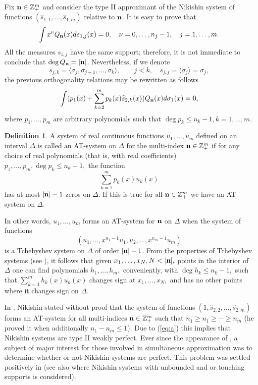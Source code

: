 \documentclass{amsart}
\theoremstyle{definition}
\newtheorem{defi}{\sc Definition}[section]
\theoremstyle{remark}
\newcommand{\la}{\langle}
\newcommand{\ra}{\rangle}
\begin{document}
Fix ${\bf n} \in {\mathbb{Z}}_+^{m}$ and consider the type II approximant of the Nikishin system of functions $(\widehat{s}_{1,1},\ldots,\widehat{s}_{1,m})$ relative to $\bf n$. It is easy to prove that
\[ \int x^{\nu} Q_{\bf n}(x) ds_{1,j}(x) =0, \quad \nu = 0,\ldots,n_j -1,\quad j=1,\ldots,m.
\]
All the measures $s_{1,j}$ have the same support; therefore, it is not immediate to conclude that $\deg Q_{\bf n} = |{\bf n}|$. Nevertheless, if we denote
\[s_{j,k} = \la \sigma_j,\sigma_{j+1},\ldots,\sigma_k \ra,\qquad j < k, \quad s_{j,j} = \la \sigma_j \ra = \sigma_j,
\]
the previous orthogonality relations may be rewritten as follows
\begin{equation}
\label{eq:a}
\int (p_1 (x) + \sum_{k=2}^m p_k(x)\widehat{s}_{2,k}(x))Q_{\bf n}(x) d \sigma_1(x) =0,
\end{equation}
where $p_1,\ldots,p_m$ are arbitrary polynomials such that $\deg p_k \leq n_k -1, k=1,\ldots,m.$

\begin{defi} \label{def:AT} A system of real continuous functions $u_1,\ldots,u_m$ defined on an interval $\Delta$ is called an AT-system on $\Delta$ for the multi-index ${\bf n} \in {\mathbb{Z}}_+^{m}$ if for any choice of real polynomials (that is, with real coefficients) $p_1,\ldots,p_m, \deg p_k \leq n_k -1,$ the function
\[ \sum_{k=1}^m p_k(x) u_k(x)
\]
has at most $|{\bf n}| -1$ zeros on $\Delta$. If this is true for all ${\bf n} \in {\mathbb{Z}}_+^{m}$ we have an AT system on $\Delta$.
\end{defi}

In other words, $u_1,\ldots,u_m$ forms an AT-system for ${\bf n}$ on $\Delta$ when the system of functions
\[ (u_1,\ldots, x^{n_1 -1}u_1,u_2,\ldots,x^{n_m-1}u_m)
\]
is a Tchebyshev system on $\Delta$ of order $|{\bf n}| -1$. From the properties of Tchebyshev systems (see \cite[Theorem 1.1]{KN}), it follows that given
$x_1,\ldots,x_N, N < |{\bf n}|,$ points in the interior of $\Delta$ one can find polynomials $h_1,\ldots,h_m,$ conveniently, with $\deg h_k \leq n_k -1,$ such that $\sum_{k=1}^m h_k(x) u_k(x)$
changes  sign at $x_1,\ldots,x_N,$ and has no other points where it changes sign on $\Delta.$

In \cite{Nik}, Nikishin stated without proof that the system of functions $(1,\widehat{s}_{2,2},\ldots,\widehat{s}_{2,m})$ forms an AT-system for all multi-indices ${\bf n}\in {\mathbb{Z}}_+^{m}$ such that $n_1 \geq n_1 \geq \cdots \geq n_m$ (he proved it when additionally $n_1 -n_m \leq 1$). Due to (\ref{eq:a}) this implies that Nikishin systems are type II weakly perfect. Ever since the appearance of \cite{Nik}, a subject of major interest for those involved in simultaneous approximation was to determine whether or not Nikishin systems are perfect. This problem was settled positively in \cite{FidLop} (see also \cite{FidLop2} where Nikishin systems with unbounded and or touching supports is considered).
\end{document}
